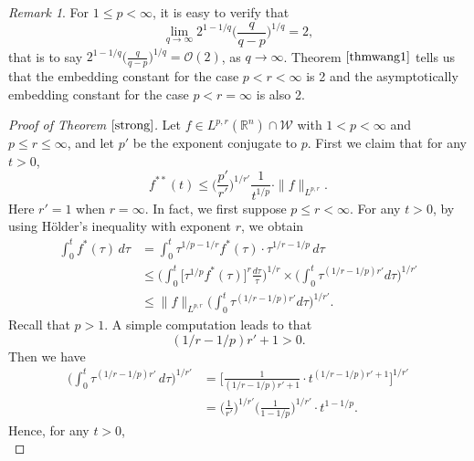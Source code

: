 \documentclass{birkjour}
\theoremstyle{definition}
\theoremstyle{remark}
\newtheorem{rem}[thm]{Remark}
\numberwithin{equation}{section}
\begin{document}
\begin{rem}
For $1\leq p<\infty$, it is easy to verify that
\begin{equation}\label{22}
\lim_{q\to\infty}2^{1-1/q}\Big(\frac{q}{q-p}\Big)^{1/q}=2,
\end{equation}
that is to say $2^{1-1/q}\big(\frac{q}{q-p}\big)^{1/q}=\mathcal{O}(2)$, as $q\to\infty$. Theorem $\ref{thmwang1}$ tells us that the embedding constant for the case $p<r<\infty$ is 2 and the asymptotically embedding constant for the case $p<r=\infty$ is also 2.
\end{rem}

\begin{proof}[Proof of Theorem $\ref{strong}$]
Let $f\in L^{p,r}(\mathbb R^n)\cap \mathcal{W}$ with $1<p<\infty$ and $p\leq r\leq\infty$, and let $p'$ be the exponent conjugate to $p$. First we claim that for any $t>0$,
\begin{equation}\label{key1}
f^{**}(t)\leq\Big(\frac{p'}{r'}\Big)^{1/{r'}}
\frac{1}{t^{1/p}}\cdot\|f\|_{L^{p,r}}.
\end{equation}
Here $r'=1$ when $r=\infty$.
In fact, we first suppose $p\leq r<\infty$. For any $t>0$, by using H\"{o}lder's inequality with exponent $r$, we obtain
\begin{equation*}
\begin{split}
\int_0^{t}f^{*}(\tau)\,d\tau&=\int_0^{t}\tau^{1/p-1/r}f^{*}(\tau)\cdot\tau^{1/r-1/p}\,d\tau\\
&\leq\bigg(\int_0^{t}\Big[\tau^{1/p}f^{*}(\tau)\Big]^r\frac{d\tau}{\tau}\bigg)^{1/r}
\times\bigg(\int_0^{t}\tau^{(1/r-1/p)r'}d\tau\bigg)^{1/{r'}}\\
&\leq \|f\|_{L^{p,r}}\bigg(\int_0^{t}\tau^{(1/r-1/p)r'}d\tau\bigg)^{1/{r'}}.
\end{split}
\end{equation*}
Recall that $p>1$. A simple computation leads to that
\begin{equation*}
(1/r-1/p)r'+1>0.
\end{equation*}
Then we have
\begin{equation*}
\begin{split}
\bigg(\int_0^{t}\tau^{(1/r-1/p)r'}\,d\tau\bigg)^{1/{r'}}
&=\Big[\frac{1}{(1/r-1/p)r'+1}\cdot t^{(1/r-1/p)r'+1}\Big]^{1/{r'}}\\
&=\Big(\frac{1}{r'}\Big)^{1/{r'}}\Big(\frac{1}{1-1/p}\Big)^{1/{r'}}\cdot t^{1-1/p}.
\end{split}
\end{equation*}
Hence, for any $t>0$,
\begin{equation*}

\end{equation*}
\end{proof}
\end{document}
